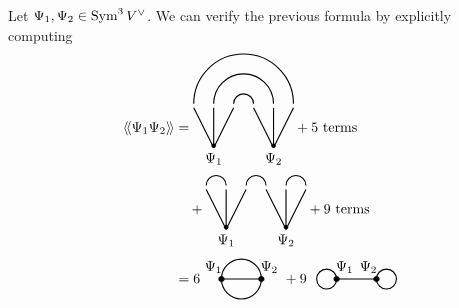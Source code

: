 \begin{example}
  Let $\Psi_1, \Psi_2 \in \operatorname{Sym}^3 V^\vee$. We can verify the previous formula by explicitly computing
  \begin{align*}
    \avg{\Psi_1 \Psi_2}
    &=
    \begin{tikzpicture}[scale=.5, baseline=4mm]
      \draw[fill=black] (1, .1) circle (1mm);
      \draw[fill=black] (4, .1) circle (1mm);
      \draw[thick] (1, 0) node[anchor=north] {$\Psi_1$} -- (0, 2);
      \draw[thick] (1, 0) -- (1, 2);
      \draw[thick] (1, 0) -- (2, 2);
      \draw[thick] (4, 0) node[anchor=north] {$\Psi_2$} -- (3, 2);
      \draw[thick] (4, 0) -- (4, 2);
      \draw[thick] (4, 0) -- (5, 2);
      \draw[thick] (0, 2.2) arc (180:0:2.5);
      \draw[thick] (1, 2.2) arc (180:0:1.5);
      \draw[thick] (2, 2.2) arc (180:0:.5);
    \end{tikzpicture}
    + 5 \text{ terms} \\
    &\quad+
    \begin{tikzpicture}[scale=.5, baseline=4mm]
      \draw[fill=black] (1, .1) circle (1mm);
      \draw[fill=black] (4, .1) circle (1mm);
      \draw[thick] (1, 0) node[anchor=north] {$\Psi_1$} -- (0, 2);
      \draw[thick] (1, 0) -- (1, 2);
      \draw[thick] (1, 0) -- (2, 2);
      \draw[thick] (4, 0) node[anchor=north] {$\Psi_2$} -- (3, 2);
      \draw[thick] (4, 0) -- (4, 2);
      \draw[thick] (4, 0) -- (5, 2);
      \draw[thick] (0, 2.2) arc (180:0:.5);
      \draw[thick] (2, 2.2) arc (180:0:.5);
      \draw[thick] (4, 2.2) arc (180:0:.5);
    \end{tikzpicture}
    + 9 \text{ terms} \\
    &= 6
    \begin{tikzpicture}[baseline=-1mm]
      \draw[thick] (0, 0) node at (-0.2, 0.3) {$\Psi_1$} -- (1, 0) node at (1.2, 0.3) {$\Psi_2$};
      \draw[thick] (0, 0) arc (180:0:.5);
      \draw[thick] (0, 0) arc (-180:0:.5);
      \draw[fill=black] (0, 0) circle (2pt);
      \draw[fill=black] (1, 0) circle (2pt);
    \end{tikzpicture}
    + 9 \ \
    \begin{tikzpicture}[baseline=-1mm]
      \draw[thick] (0, 0) node at (0.2, 0.3) {$\Psi_1$} -- (1, 0) node at (0.8, .3) {$\Psi_2$};
      \draw[thick] (-.25, 0) circle (2.5mm);
      \draw[thick] (1.25, 0) circle (2.5mm);
      \draw[fill=black] (0, 0) circle (2pt);
      \draw[fill=black] (1, 0) circle (2pt);

\end{tikzpicture}
\end{align*}
\end{example}
